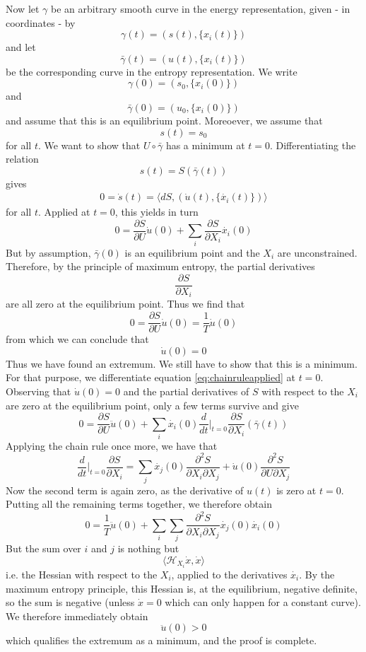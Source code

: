 \documentclass[a4paper, draft]{article}
\theoremstyle{own}
\theoremstyle{remark}
\begin{document}
Now let $\gamma$ be an arbitrary smooth curve in the energy representation, given - in coordinates - by
$$
\gamma(t) = (s(t), \{ x_i(t) \})
$$
and let 
$$
\bar{\gamma}(t) = (u(t), \{ x_i(t) \})
$$
be the corresponding curve in the entropy representation. We write
$$
\gamma(0) = (s_0,\{ x_i(0) \} )
$$
and
$$
\bar{\gamma}(0) = (u_0, \{ x_i(0) \})
$$
and assume that this is an equilibrium point. Moreoever, we assume that
$$
s(t) = s_0
$$
for all $t$. We want to show that $U \circ \bar{\gamma}$ has a minimum at $t  = 0$. Differentiating the relation
$$
s(t) = S(\bar{\gamma}(t))
$$
gives 
\begin{align}
\label{eq:chainruleapplied}
0 = \dot{s}(t) =  \langle dS, (\dot{u}(t), \{ \dot{x_i}(t)\})  \rangle
\end{align}
for all $t$. Applied at $t = 0$, this yields in turn
$$
0 = \frac{\partial S}{\partial U} \dot{u}(0) + 
\sum_i \frac{\partial S}{\partial X_i} \dot{x_i}(0)
$$
But by assumption, $\bar{\gamma}(0)$ is an equilibrium point and the $X_i$ are unconstrained. Therefore, by the principle of maximum entropy, the partial derivatives
$$
\frac{\partial S}{\partial X_i}
$$
are all zero at the equilibrium point. Thus we find that
$$
0 = \frac{\partial S}{\partial U} \dot{u}(0) = \frac{1}{T} \dot{u}(0)
$$
from which we can conclude that 
$$
\dot{u}(0) = 0
$$
Thus we have found an extremum. We still have to show that this is a minimum. For that purpose, we differentiate equation \eqref{eq:chainruleapplied} at $t = 0$. Observing that $\dot{u}(0) = 0$ and the partial derivatives of $S$ with respect to the $X_i$ are zero at the equilibrium point, only a few terms survive and give
$$
0 = \frac{\partial S}{\partial U} \ddot{u}(0) + \sum_i \dot{x_i}(0) 
\frac{d}{dt} |_{t=0} \frac{\partial S}{\partial X_i} (\bar{\gamma}(t))
$$
Applying the chain rule once more, we have that
$$
\frac{d}{dt} |_{t=0} \frac{\partial S}{\partial X_i} =
\sum_j \dot{x_j}(0) \frac{\partial^2 S}{\partial X_i \partial X_j}
+ 
\dot{u}(0) \frac{\partial^2 S}{\partial U \partial X_j} 
$$
Now the second term is again zero, as the derivative of $u(t)$ is zero at $t = 0$. Putting all the remaining terms together, we therefore obtain
$$
0 = \frac{1}{T}  \ddot{u}(0) + 
\sum_i \sum_j \frac{\partial^2 S}{\partial X_i \partial X_j} \dot{x_j}(0)  \dot{x_i}(0) 
$$
But the sum over $i$ and $j$ is nothing but
$$
\langle {\mathcal H}_{X_i} \dot{x}, \dot{x} \rangle 
$$
i.e. the Hessian with respect to the $X_i$, applied to the derivatives $\dot{x_i}$. By the maximum entropy principle, this Hessian is, at the equilibrium, negative definite, so the sum is negative (unless $\dot{x}= 0$ which can only happen for a constant curve). We therefore immediately obtain
$$
\ddot{u}(0) > 0
$$
which qualifies the extremum as a minimum, and the proof is complete.
\end{document}
